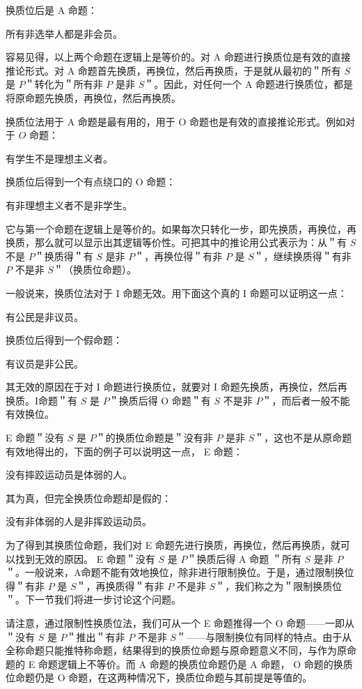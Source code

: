 换质位后是 A 命题：

所有非选举人都是非会员。

容易见得，以上两个命题在逻辑上是等价的。对 A 命题进行换质位是有效的直接推论形式。对 A 命题首先换质，再换位，然后再换质，于是就从最初的＂所有 $S$ 是 $P$＂转化为＂所有非 $P$ 是非 $S$＂。因此，对任何一个 A 命题进行换质位，都是将原命题先换质，再换位，然后再换质。

换质位法用于 A 命题是最有用的，用于 O 命题也是有效的直接推论形式。例如对于 $O$ 命题：

有学生不是理想主义者。

换质位后得到一个有点绕口的 O 命题：

有非理想主义者不是非学生。

它与第一个命题在逻辑上是等价的。如果每次只转化一步，即先换质，再换位，再换质，那么就可以显示出其逻辑等价性。可把其中的推论用公式表示为：从＂有 $S$ 不是 $P$＂换质得＂有 $S$ 是非 $P$＂，再换位得＂有非 $P$ 是 $S$＂，继续换质得＂有非 $P$ 不是非 $S$＂（换质位命题）。

一般说来，换质位法对于 I 命题无效。用下面这个真的 I 命题可以证明这一点：

有公民是非议员。

换质位后得到一个假命题：

有议员是非公民。

其无效的原因在于对 I 命题进行换质位，就要对 I 命题先换质，再换位，然后再换质。I命题＂有 $S$ 是 $P$＂换质后得 O 命题＂有 $S$ 不是非 $P$＂，而后者一般不能有效换位。

E 命题＂没有 $S$ 是 $P$＂的换质位命题是＂没有非 $P$ 是非 $S$＂，这也不是从原命题有效地得出的，下面的例子可以说明这一点， E 命题：

没有摔跤运动员是体弱的人。

其为真，但完全换质位命题却是假的：

没有非体弱的人是非挥跤运动员。

为了得到其换质位命题，我们对 E 命题先进行换质，再换位，然后再换质，就可以找到无效的原因。 E 命题＂没有 $S$ 是 $P$＂换质后得 A 命题 ＂所有 $S$ 是非 $P$＂。一般说来，A命题不能有效地换位，除非进行限制换位。于是，通过限制换位得＂有非 $P$ 是 $S$＂，再换质得＂有非 $P$ 不是非 $S$＂，我们称之为＂限制换质位＂。下一节我们将进一步讨论这个问题。

请注意，通过限制性换质位法，我们可从一个 E 命题推得一个 O 命题——一即从＂没有 $S$ 是 $P$＂推出＂有非 $P$ 不是非 $S$＂——与限制换位有同样的特点。由于从全称命题只能推特称命题，结果得到的换质位命题与原命题意义不同，与作为原命题的 E 命题逻辑上不等价。而 A 命题的换质位命题仍是 A 命题， O 命题的换质位命题仍是 O 命题，在这两种情况下，换质位命题与其前提是等值的。

